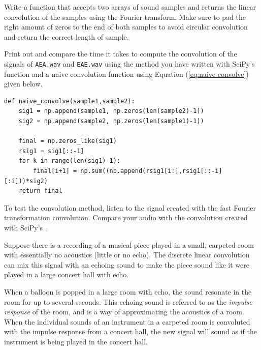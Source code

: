 \begin{problem}
Write a function that accepts two arrays of sound samples and returns the linear convolution of the samples using the Fourier transform. 
Make sure to pad the right amount of zeros to the end of both samples to avoid circular convolution and return the correct length of sample. 

Print out and compare the time it takes to compute the convolution of the signals of \texttt{AEA.wav} and \texttt{EAE.wav} using the method you have written with SciPy's  function and a naive convolution function using Equation (\ref{eq:naive-convolve}) given below.  
 
\begin{lstlisting}
def naive_convolve(sample1,sample2):
    sig1 = np.append(sample1, np.zeros(len(sample2)-1))
    sig2 = np.append(sample2, np.zeros(len(sample1)-1))
    
    final = np.zeros_like(sig1)
    rsig1 = sig1[::-1]
    for k in range(len(sig1)-1):
        final[i+1] = np.sum((np.append(rsig1[i:],rsig1[::-i][:i]))*sig2)
    return final    
\end{lstlisting}

To test the convolution method, listen to the signal created with the fast Fourier transformation convolution. 
Compare your audio with the convolution created with SciPy's .  
\end{problem}

Suppose there is a recording of a musical piece played in a small, carpeted room with essentially no acoustics (little or no echo). 
The discrete linear convolution can mix this signal with an echoing sound to make the piece sound like it were played in a large concert hall with echo. 

When a balloon is popped in a large room with echo, the sound resonate in the room for up to several seconds.
This echoing sound is referred to as the \emph{impulse response} of the room, and is a way of approximating the acoustics of a room.
When the individual sounds of an instrument in a carpeted room is convoluted with the impulse response from a concert hall, the new signal will sound as if the instrument is being played in the concert hall.

